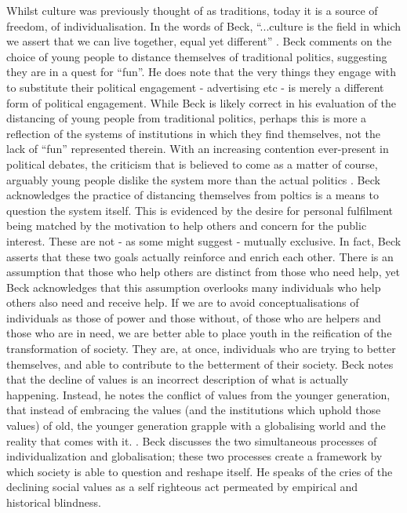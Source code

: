 Whilst culture was previously thought of as traditions, today it is a source of freedom, of individualisation. In the words of Beck, “...culture is the field in which we assert that we can live together, equal yet different” \citep{Beck2001}. 
Beck comments on the choice of young people to distance themselves of traditional politics, suggesting they are in a quest for “fun”. He does note that the very things they engage with to substitute their political engagement - advertising etc - is merely a different form of political engagement. While Beck is likely correct in his evaluation of the distancing of young people from traditional politics, perhaps this is more a reflection of the systems of institutions in which they find themselves, not the lack of “fun” represented therein. With an increasing contention ever-present in political debates, the criticism that is believed to come as a matter of course, arguably young people dislike the system more than the actual politics \citep{Beck2001}. Beck acknowledges the practice of distancing themselves from poltics is a means to question the system itself. \citep{Beck2001} 
This is evidenced by the desire for personal fulfilment being matched by the motivation to help others and concern for the public interest. These are not - as some might suggest - mutually exclusive. In fact, Beck asserts that these two goals actually reinforce and enrich each other. \citep{Beck2001} 
There is an assumption that those who help others are distinct from those who need help, yet Beck acknowledges that this assumption overlooks many individuals who help others also need and receive help. \citep{Beck2001} 
If we are to avoid conceptualisations of individuals as those of power and those without, of those who are helpers and those who are in need, we are better able to place youth in the reification of the transformation of society. They are, at once, individuals who are trying to better themselves, and able to contribute to the betterment of their society.
Beck notes that the decline of values is an incorrect description of what is actually happening. Instead, he notes the conflict of values from the younger generation, that instead of embracing the values (and the institutions which uphold those values) of old, the younger generation grapple with a globalising world and the reality that comes with it. \citep{Beck2001}. Beck discusses the two simultaneous processes of individualization and globalisation; these two processes create a framework by which society is able to question and reshape itself. He speaks of the cries of the declining social values as a self righteous act permeated by empirical and historical blindness. \citep{Beck2001} %

